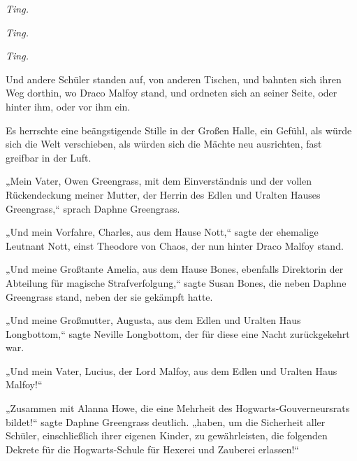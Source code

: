 \emph{Ting.}

\emph{Ting.}

\emph{Ting.}

Und andere Schüler standen auf, von anderen Tischen, und bahnten sich ihren Weg dorthin, wo Draco Malfoy stand, und ordneten sich an seiner Seite, oder hinter ihm, oder vor ihm ein.

Es herrschte eine beängstigende Stille in der Großen Halle, ein Gefühl, als würde sich die Welt verschieben, als würden sich die Mächte neu ausrichten, fast greifbar in der Luft.

„Mein Vater, Owen Greengrass, mit dem Einverständnis und der vollen Rückendeckung meiner Mutter, der Herrin des Edlen und Uralten Hauses Greengrass,“ sprach Daphne Greengrass.

„Und mein Vorfahre, Charles, aus dem Hause Nott,“ sagte der ehemalige Leutnant Nott, einst Theodore von Chaos, der nun hinter Draco Malfoy stand.

„Und meine Großtante Amelia, aus dem Hause Bones, ebenfalls Direktorin der Abteilung für magische Strafverfolgung,“ sagte Susan Bones, die neben Daphne Greengrass stand, neben der sie gekämpft hatte.

„Und meine Großmutter, Augusta, aus dem Edlen und Uralten Haus Longbottom,“ sagte Neville Longbottom, der für diese eine Nacht zurückgekehrt war.

„Und mein Vater, Lucius, der Lord Malfoy, aus dem Edlen und Uralten Haus Malfoy!“

„Zusammen mit Alanna Howe, die eine Mehrheit des Hogwarts-Gouverneursrats bildet!“ sagte Daphne Greengrass deutlich. „haben, um die Sicherheit aller Schüler, einschließlich ihrer eigenen Kinder, zu gewährleisten, die folgenden Dekrete für die Hogwarts-Schule für Hexerei und Zauberei erlassen!“

